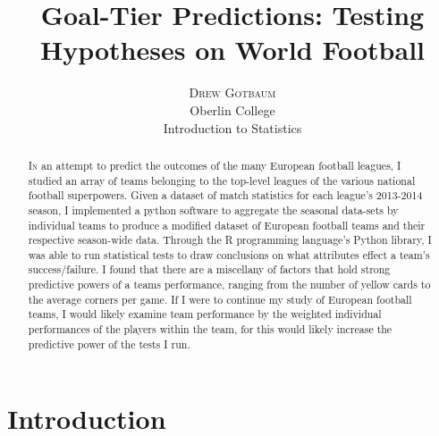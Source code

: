 \documentclass[twoside]{article}
\title{\vspace{-15mm}\fontsize{20pt}{10pt}\selectfont\textbf{Goal-Tier Predictions: Testing Hypotheses on World Football}} %
\author{
\large
\textsc{Drew Gotbaum}\\[2mm] %
\normalsize Oberlin College \\ %
\normalsize Introduction to Statistics %
\vspace{-5mm}
}
\date{}
\begin{document}
\maketitle %

\thispagestyle{fancy} %





\begin{abstract}
\lettrine[nindent=0em,lines=3]{I}n an attempt to predict the outcomes of the many European football leagues, I studied an array of teams belonging to the top-level leagues of the various national football superpowers. Given a dataset of match statistics for each league's 2013-2014 season, I implemented a python software to aggregate the seasonal data-sets by individual teams to produce a modified dataset of European football teams and their respective season-wide data. Through the R programming language's Python library, I was able to run statistical tests to draw conclusions on what attributes effect a team's success/failure. I found that there are a miscellany of factors that hold strong predictive powers of a teams performance, ranging from the number of yellow cards to the average corners per game. If I were to continue my study of European football teams, I would likely examine team performance by the weighted individual performances of the players within the team, for this would likely increase the predictive power of the tests I run.
\end{abstract}





\section{Introduction}

\end{document}
